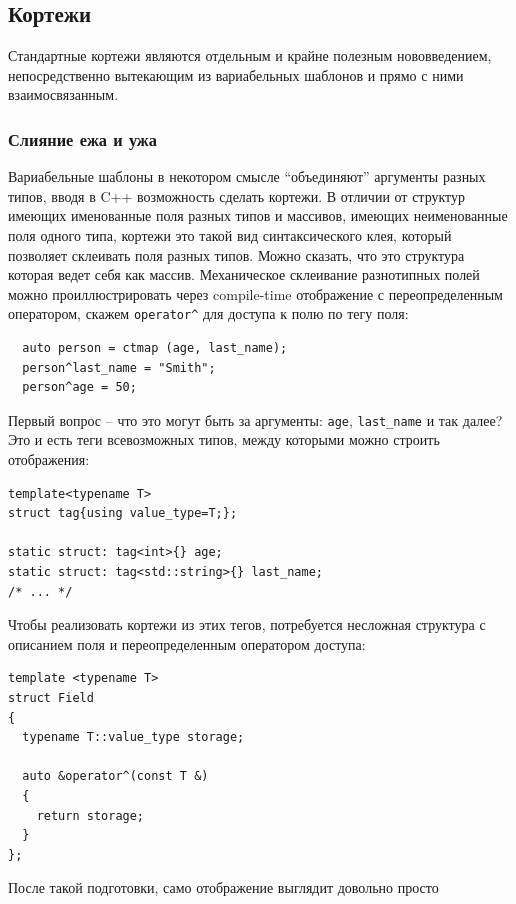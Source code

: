 \documentclass[a4paper,12pt,oneside]{article}
\begin{document}
\pagebreak
\subsection{Кортежи}

Стандартные кортежи являются отдельным и крайне полезным нововведением, непосредственно вытекающим из вариабельных шаблонов и прямо с ними взаимосвязанным.

\subsubsection{Слияние ежа и ужа}

Вариабельные шаблоны в некотором смысле ``объединяют'' аргументы разных типов, вводя в C++ возможность сделать кортежи. В отличии от структур имеющих именованные поля разных типов и массивов, имеющих неименованные поля одного типа, кортежи это такой вид синтаксического клея, который позволяет склеивать поля разных типов. Можно сказать, что это структура которая ведет себя как массив. Механическое склеивание разнотипных полей можно проиллюстрировать через compile-time отображение с переопределенным оператором, скажем \lstinline!operator^! для доступа к полю по тегу поля:

\begin{lstlisting}
  auto person = ctmap (age, last_name);
  person^last_name = "Smith";
  person^age = 50;
\end{lstlisting}

Первый вопрос -- что это могут быть за аргументы: \lstinline!age!, \lstinline!last_name! и так далее? Это и есть теги всевозможных типов, между которыми можно строить отображения:

\begin{lstlisting}
template<typename T>
struct tag{using value_type=T;};

static struct: tag<int>{} age;
static struct: tag<std::string>{} last_name;
/* ... */
\end{lstlisting}

Чтобы реализовать кортежи из этих тегов, потребуется несложная структура с описанием поля и переопределенным оператором доступа:

\begin{lstlisting}
template <typename T>
struct Field 
{
  typename T::value_type storage;

  auto &operator^(const T &) 
  {
    return storage;
  }
};
\end{lstlisting}

После такой подготовки, само отображение выглядит довольно просто
\end{document}
